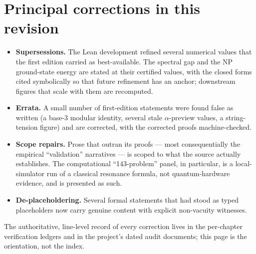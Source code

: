 \section*{Principal corrections in this revision}

\begin{itemize}
\item \textbf{Supersessions.} The Lean development refined several numerical
values that the first edition carried as best-available. The spectral gap and the
NP ground-state energy are stated at their certified values, with the closed
forms cited symbolically so that future refinement has an anchor; downstream
figures that scale with them are recomputed.
\item \textbf{Errata.} A small number of first-edition statements were found false
as written (a base-3 modular identity, several stale $\alpha$-preview values, a
string-tension figure) and are corrected, with the corrected proofs machine-checked.
\item \textbf{Scope repairs.} Prose that outran its proofs --- most consequentially
the empirical ``validation'' narratives --- is scoped to what the source actually
establishes. The computational ``143-problem'' panel, in particular, is a
local-simulator run of a classical resonance formula, not quantum-hardware
evidence, and is presented as such.
\item \textbf{De-placeholdering.} Several formal statements that had stood as
typed placeholders now carry genuine content with explicit non-vacuity witnesses.
\end{itemize}

\noindent The authoritative, line-level record of every correction lives in the
per-chapter verification ledgers and in the project's dated audit documents; this
page is the orientation, not the index.

\endinput
